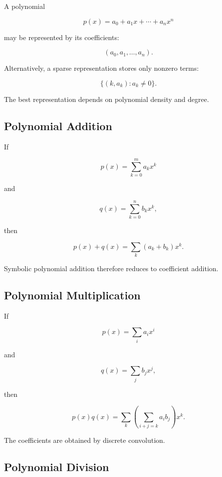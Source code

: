 A polynomial

\[
p(x)
=
a_0+a_1x+\cdots+a_nx^n
\]

may be represented by its coefficients:

\[
\boxed{
(a_0,a_1,\ldots,a_n).
}
\]

Alternatively, a sparse representation stores only nonzero terms:

\[
\boxed{
\{
(k,a_k)
:
a_k\neq0
\}.
}
\]

The best representation depends on polynomial density and degree.

\subsection{Polynomial Addition}
\label{subsec:symbolic-polynomial-addition}

If

\[
p(x)=\sum_{k=0}^{m}a_kx^k
\]

and

\[
q(x)=\sum_{k=0}^{n}b_kx^k,
\]

then

\[
\boxed{
p(x)+q(x)
=
\sum_k
(a_k+b_k)x^k.
}
\]

Symbolic polynomial addition therefore reduces to coefficient addition.

\subsection{Polynomial Multiplication}
\label{subsec:symbolic-polynomial-multiplication}

If

\[
p(x)
=
\sum_i
a_ix^i
\]

and

\[
q(x)
=
\sum_j
b_jx^j,
\]

then

\[
\boxed{
p(x)q(x)
=
\sum_k
\left(
\sum_{i+j=k}
a_ib_j
\right)
x^k.
}
\]

The coefficients are obtained by discrete convolution.

\subsection{Polynomial Division}
\label{subsec:symbolic-polynomial-division}

